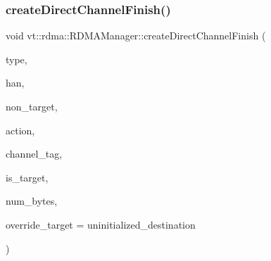 \subsubsection{\texorpdfstring{create\+Direct\+Channel\+Finish()}{createDirectChannelFinish()}}
{\footnotesize\ttfamily void vt\+::rdma\+::\+R\+D\+M\+A\+Manager\+::create\+Direct\+Channel\+Finish (\begin{DoxyParamCaption}\item[{\hyperlink{namespacevt_1_1rdma_ac848e1d9da43db6294bd06f83e5d3946}{R\+D\+M\+A\+\_\+\+Type\+Type} const \&}]{type,  }\item[{\hyperlink{namespacevt_a10442579ec4e7ebef223818e64bcf908}{R\+D\+M\+A\+\_\+\+Handle\+Type} const \&}]{han,  }\item[{\hyperlink{namespacevt_a866da9d0efc19c0a1ce79e9e492f47e2}{Node\+Type} const \&}]{non\+\_\+target,  }\item[{\hyperlink{namespacevt_ae0a5a7b18cc99d7b732cb4d44f46b0f3}{Action\+Type} const \&}]{action,  }\item[{\hyperlink{namespacevt_a84ab281dae04a52a4b243d6bf62d0e52}{Tag\+Type} const \&}]{channel\+\_\+tag,  }\item[{bool const \&}]{is\+\_\+target,  }\item[{\hyperlink{namespacevt_aab8d55968084610ce3b17057981e9300}{Byte\+Type} const \&}]{num\+\_\+bytes,  }\item[{\hyperlink{namespacevt_a866da9d0efc19c0a1ce79e9e492f47e2}{Node\+Type} const \&}]{override\+\_\+target = {\ttfamily uninitialized\+\_\+destination} }\end{DoxyParamCaption})\hspace{0.3cm}{\ttfamily [private]}}

\mbox{\label{structvt_1_1rdma_1_1_r_d_m_a_manager_ab512ce0c45479a8544e8a1eb6b2ed88a}} 
